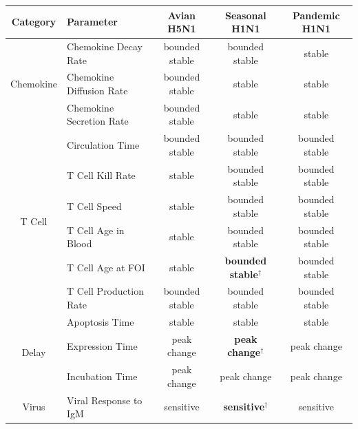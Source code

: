 \documentclass[preprint,10pt,numbers]{elsarticle}
\begin{document}
\begin{table}[!ht]
\begin{center}
\begin{tabular}{| c | l | c c c |}
  \hline                        
  Category & Parameter & Avian H5N1 & Seasonal H1N1 & Pandemic H1N1 \\
  \hline
  \multirow{3}{*}{Chemokine} & Chemokine Decay Rate & \cellcolor{blue!30}bounded stable & \cellcolor{blue!30}bounded stable & \cellcolor{green!50}stable \\
  & Chemokine Diffusion Rate & \cellcolor{blue!30}bounded stable & \cellcolor{green!50}stable& \cellcolor{green!50}stable \\
  & Chemokine Secretion Rate & \cellcolor{blue!30}bounded stable & \cellcolor{green!50}stable & \cellcolor{green!50}stable \\
  \hline
  \multirow{6}{*}{T Cell} & Circulation Time & \cellcolor{blue!30}bounded stable & \cellcolor{blue!30}bounded stable & \cellcolor{blue!30}bounded stable \\
  & T Cell Kill Rate & \cellcolor{green!50}stable & \cellcolor{blue!30}bounded stable & \cellcolor{blue!30}bounded stable \\
  & T Cell Speed & \cellcolor{green!50}stable & \cellcolor{blue!30}bounded stable & \cellcolor{blue!30}bounded stable \\
  & T Cell Age in Blood & \cellcolor{green!50}stable & \cellcolor{blue!30}bounded stable& \cellcolor{blue!30}bounded stable \\
  & T Cell Age at FOI & \cellcolor{green!50}stable & \cellcolor{blue!30}\textbf{bounded stable$^\dagger$} & \cellcolor{blue!30}bounded stable \\
  & T Cell Production Rate & \cellcolor{blue!30}bounded stable & \cellcolor{blue!30}bounded stable & \cellcolor{blue!30}bounded stable \\
  \hline
  \multirow{3}{*}{Delay} & Apoptosis Time & \cellcolor{green!50}stable & \cellcolor{green!50}stable & \cellcolor{green!50}stable \\
  & Expression Time & \cellcolor{yellow!50}peak change & \cellcolor{yellow!50}\textbf{peak change$^\dagger$} & \cellcolor{yellow!50}peak change \\
  & Incubation Time &  \cellcolor{yellow!50}peak change & \cellcolor{yellow!50}peak change & \cellcolor{yellow!50}peak change \\
  \hline 
  \multirow{4}{*}{Virus} & Viral Response to IgM & \cellcolor{red!40}sensitive & \cellcolor{red!40}\textbf{sensitive$^\dagger$} & \cellcolor{red!40}sensitive \\

\end{tabular}
\end{center}
\end{table}
\end{document}
